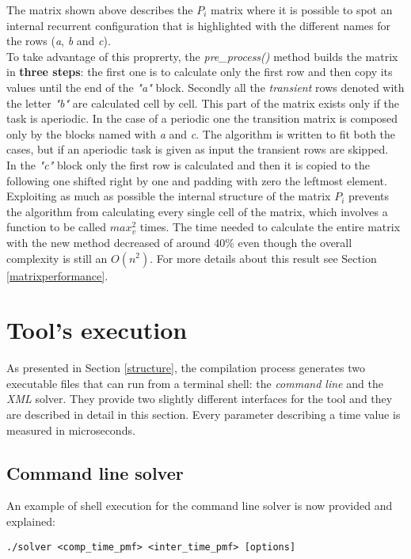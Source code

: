 The matrix shown above describes the \( P_{i} \) matrix where it is possible to spot an internal recurrent configuration that is highlighted with the different names for the rows (\emph{a}, \emph{b} and \emph{c}).\\
To take advantage of this proprerty, the \emph{pre\_process()} method builds the matrix in \textbf{three steps}: the first one is to calculate only the first row and then copy its values until the end of the \emph{"a"} block. Secondly all the \emph{transient} rows denoted with the letter \emph{"b"} are calculated cell by cell. This part of the matrix exists only if the task is aperiodic. In the case of a periodic one the transition matrix is composed only by the blocks named with \emph{a} and \emph{c}. The algorithm is written to fit both the cases, but if an aperiodic task is given as input the transient rows are skipped.\\
In the \emph{"c"} block only the first row is calculated and then it is copied to the following one shifted right by one and padding with zero the leftmost element.\\
Exploiting as much as possible the internal structure of the matrix \( P_{i} \) prevents the algorithm from calculating every single cell of the matrix, which involves a function to be called \( max_{v}^{2} \) times. The time needed to calculate the entire matrix with the new method decreased of around 40\% even though the overall complexity is still an \( O(n^{2}) \). For more details about this result see Section \ref{matrixperformance}.

\section{Tool's execution}
As presented in Section \ref{structure}, the compilation process generates two executable files that can run from a terminal shell: the \emph{command line} and the \emph{XML} solver. They provide two slightly different interfaces for the tool and they are described in detail in this section. Every parameter describing a time value is measured in microseconds.

\subsection{Command line solver}
An example of shell execution for the command line solver is now provided and explained:
\begin{lstlisting}[frame=bt, numbers=none]
  ./solver <comp_time_pmf> <inter_time_pmf> [options]
\end{lstlisting}    

